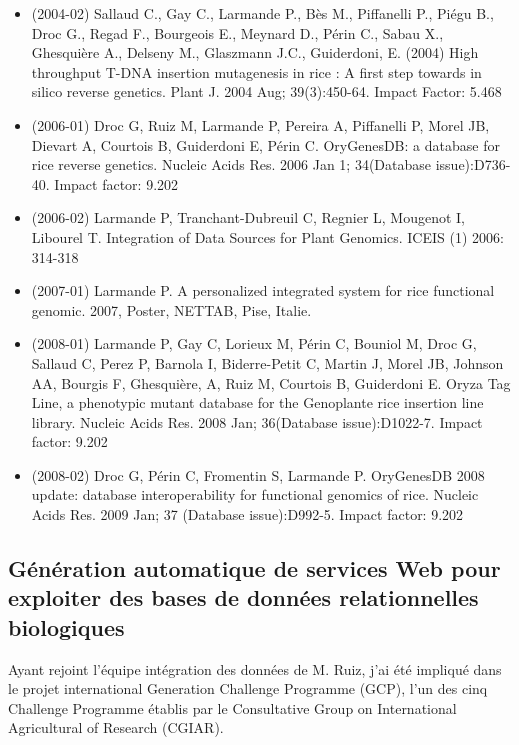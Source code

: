 \begin{itemize}

\item (2004-02) Sallaud C., Gay C., Larmande P., Bès M., Piffanelli P., Piégu B., Droc G., Regad F., Bourgeois E., Meynard D., Périn C., Sabau X., Ghesquière A., Delseny M., Glaszmann J.C., Guiderdoni, E. (2004) High throughput T-DNA insertion mutagenesis in rice : A first step towards in silico reverse genetics. Plant J. 2004 Aug; 39(3):450-64. Impact Factor: 5.468      
\item (2006-01) Droc G, Ruiz M, Larmande P, Pereira A, Piffanelli P, Morel JB, Dievart A, Courtois B, Guiderdoni E, Périn C. OryGenesDB: a database for rice reverse genetics. Nucleic Acids Res. 2006 Jan 1; 34(Database issue):D736-40. Impact factor: 9.202
\item (2006-02)  Larmande P, Tranchant-Dubreuil C, Regnier L, Mougenot I, Libourel T.
Integration of Data Sources for Plant Genomics. ICEIS (1) 2006: 314-318
\item (2007-01) Larmande P. A personalized integrated system for rice functional genomic. 2007, Poster, NETTAB, Pise, Italie.
\item (2008-01) Larmande P, Gay C, Lorieux M, Périn C, Bouniol M, Droc G, Sallaud C, Perez P, Barnola I, Biderre-Petit C, Martin J, Morel JB, Johnson AA, Bourgis F, Ghesquière, A, Ruiz M, Courtois B, Guiderdoni E. Oryza Tag Line, a phenotypic mutant database for the Genoplante rice insertion line library. Nucleic Acids Res. 2008 Jan; 36(Database issue):D1022-7. Impact factor: 9.202 
\item (2008-02) Droc G, Périn C, Fromentin S, Larmande P. OryGenesDB 2008 update: database interoperability for functional genomics of rice. Nucleic Acids Res. 2009 Jan; 37 (Database issue):D992-5. Impact factor: 9.202

\end{itemize}

\subsection*{Génération automatique de services Web pour exploiter des bases de données relationnelles biologiques}
\label{SWS}

Ayant rejoint l’équipe intégration des données de M. Ruiz, j’ai été impliqué dans le projet international Generation Challenge Programme (GCP), l’un des cinq Challenge Programme établis par le Consultative Group on International Agricultural of Research (CGIAR).  \\

